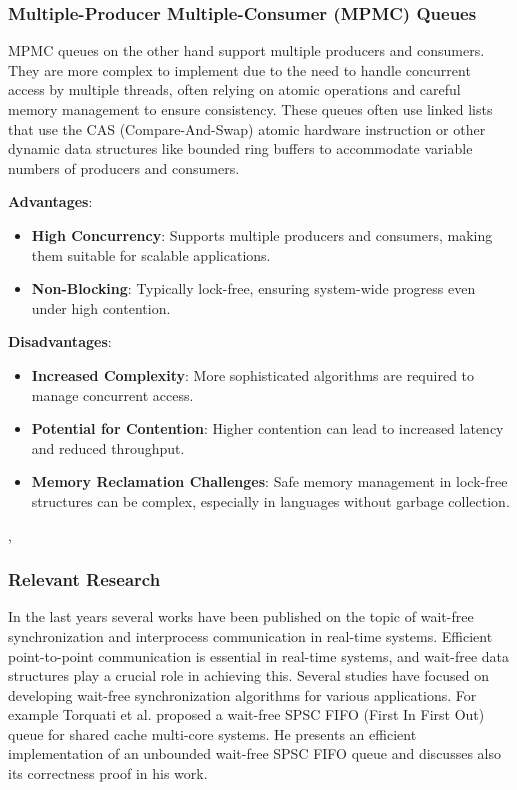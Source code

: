 \documentclass[ a4paper,
                toc=bibliography
              ]{scrartcl}
\begin{document}
\subsubsection{Multiple-Producer Multiple-Consumer (MPMC) Queues}

MPMC queues on the other hand support multiple producers and consumers. They are more complex to implement due to the need to handle concurrent access by multiple threads, often relying on atomic operations and careful memory management to ensure consistency. These queues often use linked lists that use the CAS (Compare-And-Swap) atomic hardware instruction or other dynamic data structures like bounded ring buffers to accommodate variable numbers of producers and consumers. \newpage

\textbf{Advantages}:
\begin{itemize}
	\item \textbf{High Concurrency}: Supports multiple producers and consumers, making them suitable for scalable applications.
	\item \textbf{Non-Blocking}: Typically lock-free, ensuring system-wide progress even under high contention.
\end{itemize}


\textbf{Disadvantages}:
\begin{itemize}
	\item \textbf{Increased Complexity}: More sophisticated algorithms are required to manage concurrent access.
	\item \textbf{Potential for Contention}: Higher contention can lead to increased latency and reduced throughput.
	\item \textbf{Memory Reclamation Challenges}: Safe memory management in lock-free structures can be complex, especially in languages without garbage collection.
\end{itemize}
\cite{Gidenstam2010CacheAwareLockFreeQueues}, \cite{timnat2014practical,michael1996simple}

\subsubsection{Relevant Research}
In the last years several works have been published on the topic of wait-free synchronization and interprocess communication in real-time systems. Efficient point-to-point communication is essential in real-time systems, and wait-free data structures play a crucial role in achieving this. Several studies have focused on developing wait-free synchronization algorithms for various applications. For example Torquati et al. proposed a wait-free SPSC FIFO (First In First Out) queue for shared cache multi-core systems. He presents an efficient implementation of an unbounded wait-free SPSC FIFO queue and discusses also its correctness proof in his work. \cite{torquati2010singleproducersingleconsumerqueuessharedcache}
\end{document}
